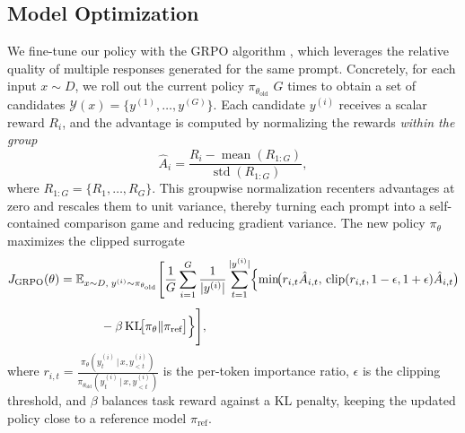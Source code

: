 

\subsection{Model Optimization}

We fine-tune our policy with the GRPO algorithm \citep{deepseekmath,deepseek}, which leverages the relative quality of multiple responses generated for the same prompt. Concretely, for each input $x\!\sim\!D$, we roll out the current policy $\pi_{\theta_{\text{old}}}$ $G$ times to obtain a set of candidates $\mathcal{Y}(x)=\{y^{(1)},\dots,y^{(G)}\}$.  Each candidate $y^{(i)}$ receives a scalar reward $R_i$, and the advantage is computed by normalizing the rewards \emph{within the group}
\begin{equation}
    \hat{A}_i=\frac{R_i-\operatorname{mean}(R_{1:G})}{\operatorname{std}(R_{1:G})},
    \label{eq:grpo_adv}
\end{equation}
where $R_{1:G}=\{R_1,\dots,R_G\}$. This groupwise normalization recenters advantages at zero and rescales them to unit variance, thereby turning each prompt into a self-contained comparison game and reducing gradient variance.  The new policy $\pi_\theta$ maximizes the clipped surrogate
\begin{equation}
\begin{aligned}
J_{\text{GRPO}}(\theta)=\;
&\mathbb{E}_{x\sim D,\; y^{(i)}\sim\pi_{\theta_{\text{old}}}}
\Biggl[
\frac{1}{G}\sum_{i=1}^{G}\frac{1}{|y^{(i)}|}
\sum_{t=1}^{|y^{(i)}|}
\Bigl\{
\min\!\bigl(r_{i,t}\hat{A}_{i,t},\,
\operatorname{clip}(r_{i,t},1-\epsilon,1+\epsilon)\hat{A}_{i,t}\bigr)
\\[4pt]
&\qquad
-\beta\,\mathrm{KL}\!\bigl[\pi_\theta\|\pi_{\text{ref}}\bigr]
\Bigr\}
\Biggr],
\end{aligned}
\label{eq:grpo_obj}
\end{equation}
where 
$r_{i,t}=
\tfrac{\pi_\theta(y^{(i)}_t\,|\,x,y^{(i)}_{<t})}
      {\pi_{\theta_{\text{old}}}(y^{(i)}_t\,|\,x,y^{(i)}_{<t})}$
is the per-token importance ratio, $\epsilon$ is the clipping threshold, and $\beta$ balances task reward against a KL penalty, keeping the updated policy close to a reference model $\pi_{\text{ref}}$.


